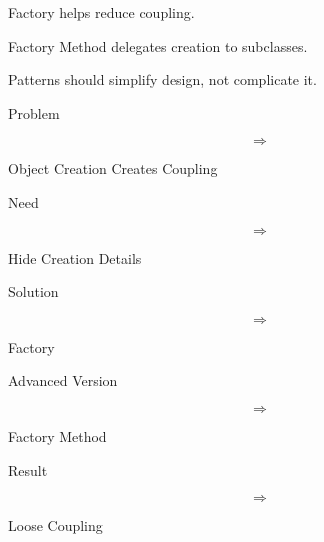 \documentclass[11pt,a4paper]{book}
\begin{document}

\begin{rosettarule}

Factory helps reduce coupling.

\end{rosettarule}


\begin{rosettarule}

Factory Method delegates
creation to subclasses.

\end{rosettarule}


\begin{rosettarule}

Patterns should simplify design,
not complicate it.

\end{rosettarule}


\begin{compressionbox}

Problem

\[
\Rightarrow
\]

Object Creation Creates Coupling

\vspace{0.5em}

Need

\[
\Rightarrow
\]

Hide Creation Details

\vspace{0.5em}

Solution

\[
\Rightarrow
\]

Factory

\vspace{0.5em}

Advanced Version

\[
\Rightarrow
\]

Factory Method

\vspace{0.5em}

Result

\[
\Rightarrow
\]

Loose Coupling

\end{compressionbox}
\end{document}
